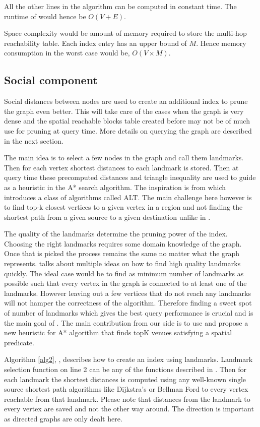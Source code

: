 All the other lines in the algorithm can be computed in constant time. The runtime of {\rrpspatial} would hence be $O(V + E)$.

Space complexity would be amount of memory required to store the multi-hop reachability table. Each index entry has an upper bound of $M$. Hence memory consumption in the worst case would be, $O(V \times M)$.

\subsection{Social component}
Social distances between nodes are used to create an additional index to prune the graph even better. This will take care of the cases when the graph is very dense and the spatial reachable blocks table created before may not be of much use for pruning at query time. More details on querying the graph are described in the next section.

The main idea is to select a few nodes in the graph and call them landmarks. Then for each vertex shortest distances to each landmark is stored. Then at query time these precomputed distances and triangle inequality are used to guide as a heuristic in the A* search algorithm. The inspiration is from \cite{AC2005} which introduces a class of algorithms called ALT. The main challenge here however is to find top-k closest vertices to a given vertex in a region and not finding the shortest path from a given source to a given destination unlike in \cite{AC2005}.

The quality of the landmarks determine the pruning power of the index. Choosing the right landmarks requires some domain knowledge of the graph. Once that is picked the process remains the same no matter what the graph represents. \cite{AC2005} talks about multiple ideas on how to find high quality landmarks quickly. The ideal case would be to find as minimum number of landmarks as possible such that every vertex in the graph is connected to at least one of the landmarks.  However leaving out a few vertices that do not reach any landmarks will not hamper the correctness of the algorithm. Therefore finding a sweet spot of number of landmarks which gives the best query performance is crucial and is the main goal of \cite{AC2005}. The main contribution from our side is to use {\rrpsocial} and propose a new heuristic for A* algorithm that finds topK venues satisfying a spatial predicate.

Algorithm \ref{alg2}, {\rrpsocial}, describes how to create an index using landmarks. Landmark selection function on line 2 can be any of the functions described in \cite{AC2005}. Then for each landmark the shortest distances is computed using any well-known single source shortest path algorithms like Dijkstra's or Bellman Ford to every vertex reachable from that landmark. Please note that distances from the landmark to every vertex are saved and not the other way around. The direction is important as directed graphs are only dealt here.

